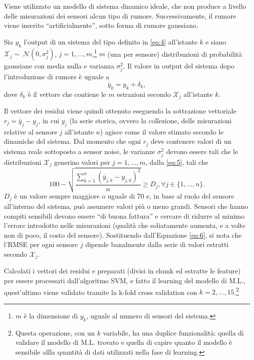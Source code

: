 \documentclass[Lau,binding=0.6cm,noexaminfo]{sapthesis}
\begin{document}
Viene utilizzato un modello di sistema dinamico ideale, che non produce a livello delle misurazioni dei sensori alcun tipo di rumore. Successivamente, il rumore viene inserito ``artificialmente'', sotto forma di rumore gaussiano.

Sia $y_k$ l'output di un sistema del tipo definito in \ref{eq:4} all'istante $k$ e siano $\mathcal{X}_j \sim~\mathcal{N}(0,\sigma_j^2)$, $j = 1,\ldots,m$,\footnote{$m$ \`e la dimensione di $y_k$, uguale al numero di sensori del sistema.} $m$ (una per sensore) distribuzioni di probabilit\`a gaussiane con media nulla e varianza $\sigma_j^2$.
Il valore in output del sistema dopo l'introduzione di rumore \`e uguale a
\begin{equation}
    \bar{y}_k = y_k + \delta_k\label{eq:6},
\end{equation}
dove $\delta_k$ \`e il vettore che contiene le $m$ estrazioni secondo $\mathcal{X}_j$ all'istante $k$.

Il vettore dei residui viene quindi ottenuto eseguendo la sottrazione vettoriale $r_j = \bar{y}_j - y_j$, in cui $y_j$ (la serie storica, ovvero la collezione, delle misurazioni relative al sensore $j$ all'istante $n$) agisce come il valore stimato secondo le dinamiche del sistema.
Dal momento che ogni $r_j$ deve contenere valori di un sistema reale sottoposto a sensor noise, le varianze $\sigma_j^2$ devono essere tali che le distribuzioni $\mathcal{X}_j$ generino valori per $j=1,\ldots,m$, dalla \ref{eq:5}, tali che
\begin{equation}
    100 - \sqrt{\frac{\sum_{k=1}^n (\bar{y}_{j,k} - y_{j,k})^2}{n}} \geq D_j, \forall j\in\{1,\ldots,n\}\label{eq:7}.
\end{equation}
$D_j$ \`e un valore sempre maggiore o uguale di 70 e, in base al ruolo del sensore all'interno del sistema, pu\`o assumere valori pi\`u o meno grandi.
Sensori che hanno compiti sensibili devono essere ``di buona fattura'' e cercare di ridurre al minimo l'errore introdotto nelle misurazioni (qualit\`a che soliatamente aumenta, e a volte non di poco, il costo del sensore).
Sostituendo dall'Equazione \ref{eq:6}, si nota che l'RMSE per ogni sensore $j$ dipende banalmente dalla serie di valori estratti secondo $\mathcal{X}_j$.

Calcolati i vettori dei residui e preparati (divisi in chunk ed estratte le feature) per essere processati dall'algoritmo SVM, e fatto il learning del modello di M.L., 
quest'ultimo viene validato tramite la k-fold cross validation con $k=2,\ldots,15$.\footnote{Questa operazione, con un $k$ variabile, ha una duplice funzionalit\`a: quella di validare il modello di M.L. trovato e quella di capire quanto il modello \`e sensibile allla quantit\`a di dati utilizzati nella fase di learning.}
\end{document}

